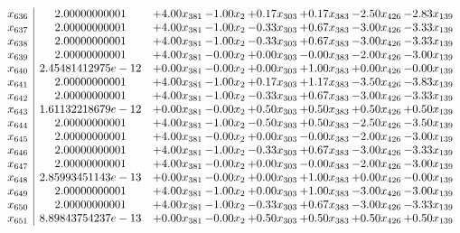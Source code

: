 \documentclass[8pt]{article}
\begin{document}
\[\begin{array}{c| c c@{\hskip 2pt} c@{\hskip 2pt} c@{\hskip 2pt} c@{\hskip 2pt} c@{\hskip 2pt} c@{\hskip 2pt} }
 x_{636}   &  2.00000000001 & +  4.00 x_{381} & -1.00 x_{2} & +  0.17 x_{303} & +  0.17 x_{383} & -2.50 x_{426} & -2.83 x_{139}\\
 x_{637}   &  2.00000000001 & +  4.00 x_{381} & -1.00 x_{2} & -0.33 x_{303} & +  0.67 x_{383} & -3.00 x_{426} & -3.33 x_{139}\\
 x_{638}   &  2.00000000001 & +  4.00 x_{381} & -1.00 x_{2} & -0.33 x_{303} & +  0.67 x_{383} & -3.00 x_{426} & -3.33 x_{139}\\
 x_{639}   &  2.00000000001 & +  4.00 x_{381} & -0.00 x_{2} & +  0.00 x_{303} & -0.00 x_{383} & -2.00 x_{426} & -3.00 x_{139}\\
 x_{640}   &  2.45481412975e-12 & +  0.00 x_{381} & -0.00 x_{2} & +  0.00 x_{303} & +  1.00 x_{383} & +  0.00 x_{426} & -0.00 x_{139}\\
 x_{641}   &  2.00000000001 & +  4.00 x_{381} & -1.00 x_{2} & +  0.17 x_{303} & +  1.17 x_{383} & -3.50 x_{426} & -3.83 x_{139}\\
 x_{642}   &  2.00000000001 & +  4.00 x_{381} & -1.00 x_{2} & -0.33 x_{303} & +  0.67 x_{383} & -3.00 x_{426} & -3.33 x_{139}\\
 x_{643}   &  1.61132218679e-12 & +  0.00 x_{381} & -0.00 x_{2} & +  0.50 x_{303} & +  0.50 x_{383} & +  0.50 x_{426} & +  0.50 x_{139}\\
 x_{644}   &  2.00000000001 & +  4.00 x_{381} & -1.00 x_{2} & -0.50 x_{303} & +  0.50 x_{383} & -2.50 x_{426} & -3.50 x_{139}\\
 x_{645}   &  2.00000000001 & +  4.00 x_{381} & -0.00 x_{2} & +  0.00 x_{303} & -0.00 x_{383} & -2.00 x_{426} & -3.00 x_{139}\\
 x_{646}   &  2.00000000001 & +  4.00 x_{381} & -1.00 x_{2} & -0.33 x_{303} & +  0.67 x_{383} & -3.00 x_{426} & -3.33 x_{139}\\
 x_{647}   &  2.00000000001 & +  4.00 x_{381} & -0.00 x_{2} & +  0.00 x_{303} & -0.00 x_{383} & -2.00 x_{426} & -3.00 x_{139}\\
 x_{648}   &  2.85993451143e-13 & +  0.00 x_{381} & -0.00 x_{2} & +  0.00 x_{303} & +  1.00 x_{383} & +  0.00 x_{426} & -0.00 x_{139}\\
 x_{649}   &  2.00000000001 & +  4.00 x_{381} & -1.00 x_{2} & +  0.00 x_{303} & +  1.00 x_{383} & -3.00 x_{426} & -3.00 x_{139}\\
 x_{650}   &  2.00000000001 & +  4.00 x_{381} & -1.00 x_{2} & -0.33 x_{303} & +  0.67 x_{383} & -3.00 x_{426} & -3.33 x_{139}\\
 x_{651}   &  8.89843754237e-13 & +  0.00 x_{381} & -0.00 x_{2} & +  0.50 x_{303} & +  0.50 x_{383} & +  0.50 x_{426} & +  0.50 x_{139}\\

\end{array}\]
\end{document}
